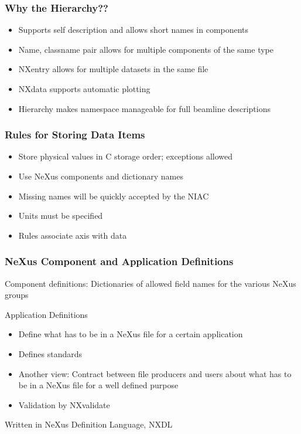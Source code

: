 \documentclass{beamer}
\newcommand{\changefont}[3] {
 \fontfamily{#1} \fontseries{#2} \fontshape{#3} \selectfont}
\begin{document}
\begin{frame} \frametitle{Why the Hierarchy??}
\begin{itemize}
\item<1->Supports self description and allows short names in components
\item<2->Name, classname pair allows for multiple components of the same type
\item<3->NXentry allows for multiple datasets in the same file
\item<4->NXdata supports automatic plotting
\item<5->Hierarchy makes namespace manageable for full beamline descriptions
\end{itemize}
\end{frame}


\begin{frame}
\frametitle{Rules for Storing Data Items}
\begin{itemize}
\item Store physical values in C storage order; exceptions allowed
\item Use NeXus components and dictionary names
\item Missing names will be quickly accepted by the NIAC
\item Units must be specified
\item Rules associate axis with data
\end{itemize}
\end{frame}


\begin{frame} \frametitle{NeXus Component and Application Definitions }
\begin{itemize}
\item Component definitions: 
 Dictionaries of allowed field names for the various NeXus groups
{\changefont{cmr}{bx}{sc} 
\item Application Definitions
\begin{itemize}
\item Define what has to be in a NeXus file for a certain application
\item Defines standards
\item Another view: Contract between file producers and users about what has to be in 
 a NeXus file for a well defined purpose 
\item Validation by NXvalidate
\end{itemize}
}
\item Written in NeXus Definition Language, NXDL
\end{itemize}
\end{frame}
\end{document}
